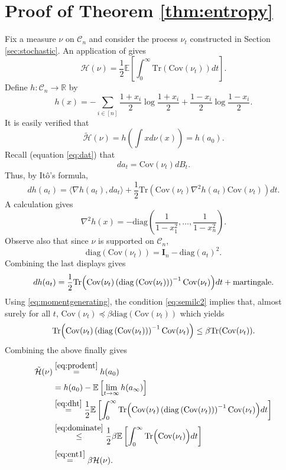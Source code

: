 \documentclass[12pt]{article}
\def \RR {\mathbb R}
\def \EE {\mathbb E}
\def \DC {\mathcal{C}_n}
\def \Id {\mathbf{I}_n}
\def \COV {\mathrm{Cov}}
\theoremstyle{definition}
\theoremstyle{remark}
\begin{document}
\section{Proof of Theorem \ref{thm:entropy} }
Fix a measure $\nu$ on $\DC$ and consider the process $\nu_t$ constructed in Section \ref{sec:stochastic}. An application of \cite[Lemma 6]{Eldan-taming} gives
\begin{equation}\label{eq:ent1}
\mathcal{H}(\nu) = \frac{1}{2} \EE \left [\int_0^\infty \mathrm{Tr} \left (\COV(\nu_t) \right ) dt \right ].
\end{equation}
Define $h:\DC \to \RR$ by
$$
h(x) = - \sum_{i\in [n]} \frac{1+x_i}{2} \log \frac{1+x_i}{2} + \frac{1-x_i}{2} \log \frac{1-x_i}{2}.
$$
It is easily verified that 
\begin{equation}\label{eq:prodent}
\tilde{\mathcal{H}}(\nu) = h \left ( \int x d \nu(x) \right ) = h \left ( a_0 \right ).
\end{equation}
Recall (equation \eqref{eq:dat}) that
$$
d a_t = \COV(\nu_t) d B_t.
$$
Thus, by It\^o's formula,
$$
d h(a_t) = \langle \nabla h(a_t), d a_t \rangle + \frac{1}{2} \mathrm{Tr} \left ( \COV(\nu_t) \nabla^2 h(a_t) \COV(\nu_t)\right ) dt.
$$
A calculation gives
$$
\nabla^2 h(x) = - \mathrm{diag} \left ( \frac{1}{1-x_1^2}, \dots, \frac{1}{1-x_n^2} \right ).
$$
Observe also that since $\nu$ is supported on $\DC$,
$$
\mathrm{diag} \left ( \COV(\nu_t) \right ) = \Id - \mathrm{diag}(a_t)^2.
$$
Combining the last displays gives
\begin{equation}\label{eq:dht}
d h(a_t) = \frac{1}{2} \mathrm{Tr} \Bigl ( \COV(\nu_t) \left (\mathrm{diag} \left ( \COV(\nu_t) \right ) \right )^{-1} \COV(\nu_t)\Bigr ) dt + \mbox{martingale}.
\end{equation}
Using \eqref{eq:momentgenerating}, the condition \eqref{eq:semilc2} implies that, almost surely for all $t$, $\COV(\nu_t) \preceq \beta \mathrm{diag} \left ( \COV(\nu_t) \right )$ which yields
\begin{equation}\label{eq:dominate}
\mathrm{Tr} \Bigl ( \COV(\nu_t) \left (\mathrm{diag} \left ( \COV(\nu_t) \right ) \right )^{-1} \COV(\nu_t)\Bigr ) \leq \beta \mathrm{Tr}(\COV(\nu_t)).
\end{equation}
Combining the above finally gives
\begin{align*}
\tilde{\mathcal{H}}(\nu) & \stackrel{\eqref{eq:prodent}}{=} h(a_0) \\
& = h(a_0) - \EE \left [\lim_{t \to \infty} h(a_\infty) \right ] \\
& \stackrel{\eqref{eq:dht}}{=} \frac{1}{2} \EE \left [\int_0^\infty \mathrm{Tr} \Bigl ( \COV(\nu_t) \left (\mathrm{diag} \left ( \COV(\nu_t) \right ) \right )^{-1} \COV(\nu_t)\Bigr ) dt \right ] \\
& \stackrel{\eqref{eq:dominate}}{\leq} \frac{1}{2} \beta \EE \left [\int_0^\infty \mathrm{Tr} \Bigl ( \COV(\nu_t) \Bigr ) dt \right ] \\
& \stackrel{\eqref{eq:ent1}}{=} \beta \mathcal{H}(\nu).
\end{align*}


\end{document}
